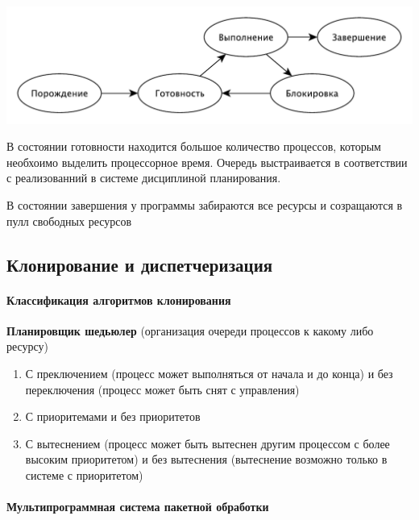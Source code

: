 \documentclass[a4paper, 14pt]{report}
\begin{document}
\begin{center}
    \includegraphics[scale=0.7]{os2}
\end{center}

В состоянии готовности находится большое количество процессов, которым необхоимо выделить процессорное время. Очередь выстраивается в соответствии с реализованний в системе дисциплиной планирования.

В состоянии завершения у программы забираются все ресурсы и созращаются в пулл свободных ресурсов

\subsection{Клонирование и диспетчеризация}

\paragraph{Классификация алгоритмов клонирования}

\textbf{Планировщик шедьюлер} (организация очереди процессов к какому либо ресурсу)

\begin{enumerate}
        \item С преключением (процесс может выполняться от начала и до конца) и без переключения (процесс может быть снят с управления)
        \item С приоритемами и без приоритетов
        \item С вытеснением (процесс может быть вытеснен другим процессом с более высоким приоритетом) и без вытеснения (вытеснение возможно только в системе с приоритетом)
\end{enumerate}

\paragraph{Мультипрограммная система пакетной обработки}
\end{document}
